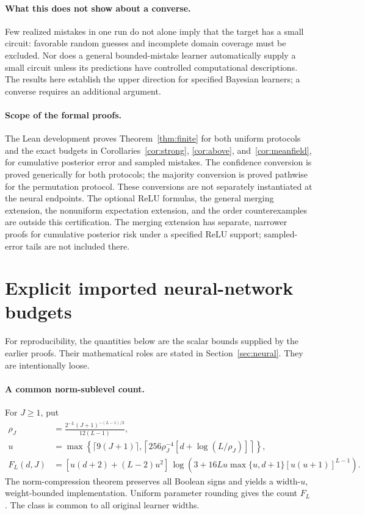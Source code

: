 \documentclass[11pt]{article}
\theoremstyle{remark}\newtheorem{remark}[theorem]{Remark}
\begin{document}
\paragraph{What this does not show about a converse.}
Few realized mistakes in one run do not alone imply that the target has a
small circuit: favorable random guesses and incomplete domain coverage
must be excluded. Nor does a general bounded-mistake learner automatically
supply a small circuit unless its predictions have controlled computational
descriptions. The results here establish the upper direction for specified
Bayesian learners; a converse requires an additional argument.

\paragraph{Scope of the formal proofs.}
The Lean development proves Theorem~\ref{thm:finite} for both uniform
protocols and the exact budgets in Corollaries~\ref{cor:strong},
\ref{cor:above}, and~\ref{cor:meanfield}, for cumulative posterior error
and sampled mistakes. The confidence conversion is proved generically
for both protocols; the majority conversion is proved pathwise for the
permutation protocol. These conversions are not separately instantiated
at the neural endpoints. The optional ReLU formulas, the general merging
extension, the nonuniform expectation extension, and the order
counterexamples are outside this certification. The merging extension
has separate, narrower proofs for cumulative posterior risk under a
specified ReLU support; sampled-error tails are not included there.

\appendix
\section{Explicit imported neural-network budgets}\label{app:budgets}

For reproducibility, the quantities below are the scalar bounds supplied
by the earlier proofs. Their mathematical roles are stated in Section~\ref{sec:neural}.
They are intentionally loose.

\paragraph{A common norm-sublevel count.}
For $J\ge1$, put
\begin{align*}
 \rho_J&=\frac{2^{-L}(J+1)^{-(L-1)/2}}{12(L-1)},\\
 u&=\max\left\{\lceil9(J+1)\rceil,
       \left\lceil256\rho_J^{-4}[d+\log(L/\rho_J)]\right\rceil\right\},\\
 F_L(d,J)&=[u(d+2)+(L-2)u^2]\,
 \log\left(3+16Lu\max\{u,d+1\}[u(u+1)]^{L-1}\right).
\end{align*}
The norm-compression theorem preserves all Boolean signs and yields a
width-$u$, weight-bounded implementation. Uniform parameter rounding gives
the count $F_L$. The class is common to all original learner widths.
\end{document}
